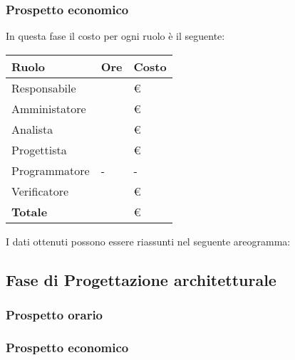 \subsubsection{Prospetto economico}
In questa fase il costo per ogni ruolo è il seguente:

\begin{center}
	\begin{longtable}{|p{}|p{}|p{}|}
		\hline
		\rowcolor{lighter-grayer}
		\centering\textbf{Ruolo} & \centering\textbf{Ore} & \textbf{Costo} \\
		\hline
		\endfirsthead
		
		\centering Responsabile & \centering & \euro\\
		\hline
		\centering Amministatore & \centering & \euro\\
		\hline
		\centering Analista & \centering & \euro\\
		\hline
		\centering Progettista & \centering & \euro\\
		\hline
		\centering Programmatore & \centering - & - \\
		\hline
		\centering Verificatore & \centering & \euro\\
		\hline
		\centering\textbf{Totale} & \centering & \euro\\
		\hline
	\end{longtable}
\end{center}

I dati ottenuti possono essere riassunti nel seguente areogramma:
\\



\subsection{Fase di Progettazione architetturale}
\subsubsection{Prospetto orario}

\subsubsection{Prospetto economico}

